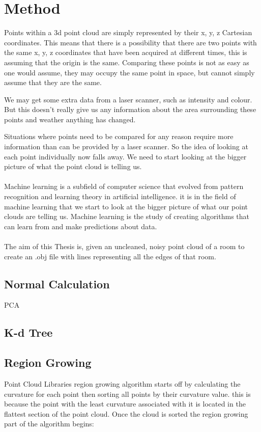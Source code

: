 \chapter{Method}
	
	Points within a 3d point cloud are simply represented by their x, y, z Cartesian coordinates. This means that there is a possibility that there are two points with the same x, y, z coordinates that have been acquired at different times, this is assuming that the origin is the same. Comparing these points is not as easy as one would assume, they may occupy the same point in space, but cannot simply assume that they are the same.
	
	We may get some extra data from a laser scanner, such as intensity and colour. But this doesn't really give us any information about the area surrounding these points and weather anything has changed.
	
	Situations where points need to be compared for any reason require more information than can be provided by a laser scanner. So the idea of looking at each point individually now falls away. We need to start looking at the bigger picture of what the point cloud is telling us.\\
	\\
	Machine learning is a subfield of computer science that evolved from pattern recognition and learning theory in artificial intelligence. it is in the field of machine learning that we start to look at the bigger picture of what our point clouds are telling us. Machine learning is the study of creating algorithms that can learn from and make predictions about data.\\
	\\
	The aim of this Thesis is, given an uncleaned, noisy point cloud of a room to create an .obj file with lines representing all the edges of that room.
	
	
	\section{Normal Calculation}
		PCA
		
	\section{K-d Tree}
		
	
	\section{Region Growing}
	Point Cloud Libraries region growing algorithm starts off by calculating the curvature for each point then sorting all points by their curvature value. this is because the point with the least curvature associated with it is located in the flattest section of the point cloud. Once the cloud is sorted the region growing part of the algorithm begins:
	
